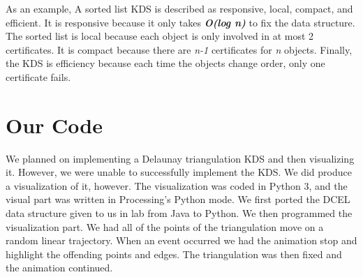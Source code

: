 \documentclass{article}
\begin{document}
As an example, A sorted list KDS is described as responsive, local, compact, and efficient.  It is responsive because it only takes \textbf{\textit{O(log n)}} to fix the data structure.  The sorted list is local because each object is only involved in at most 2 certificates.  It is compact because there are \textit{n-1} certificates for \textit{n} objects.  Finally, the KDS is efficiency because each time the objects change order, only one certificate fails.  

\section*{Our Code}
We planned on implementing a Delaunay triangulation KDS and then visualizing it.  However, we were unable to successfully implement the KDS.  We did produce a visualization of it, however.  The visualization was coded in Python 3, and the visual part was written in Processing's Python mode.  We first ported the DCEL data structure given to us in lab from Java to Python.  We then programmed the visualization part.  We had all of the points of the triangulation move on a random linear trajectory.  When an event occurred we had the animation stop and highlight the offending points and edges.  The triangulation was then fixed and the animation continued.  
\end{document}
